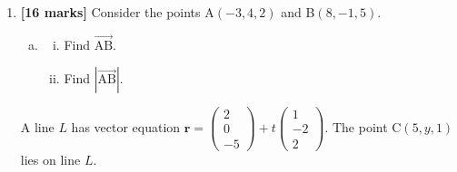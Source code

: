 \documentclass[12pt, twoside]{article}
\begin{document}
\begin{enumerate}
\begin{center}
\end{center}

\begin{enumerate}[(a)]
    \item Let SR $= x$. Use the cosine rule to show that $x^2 - (76\cos 43^\circ)x + 420 = 0$.
    \item Hence or otherwise, find the total distance along the road where the signal from the tower can reach cellular phones.
\end{enumerate}

\newpage

\section*{Section B}

\setcounter{enumi}{7}

\item \textbf{[16 marks]} Consider the points A$(-3, 4, 2)$ and B$(8, -1, 5)$.

\begin{enumerate}[(a)]
    \item \begin{enumerate}[(i)]
        \item Find $\overrightarrow{\mathrm{AB}}$.
        \item Find $\left|\overrightarrow{\mathrm{AB}}\right|$.
    \end{enumerate}
\end{enumerate}

A line $L$ has vector equation $\mathbf{r} = \begin{pmatrix} 2 \\ 0 \\ -5 \end{pmatrix} + t\begin{pmatrix} 1 \\ -2 \\ 2 \end{pmatrix}$. The point C$(5, y, 1)$ lies on line $L$.


\end{enumerate}
\end{document}
